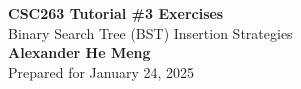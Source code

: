 \begin{titlepage}
    \null %
    \vfill
    \begin{center}
        {\fontsize{35}{48}\selectfont \bfseries CSC263 Tutorial \#3 Exercises}
        \vspace{20pt} \\
        {\LARGE Binary Search Tree (BST) Insertion Strategies} \\
        \vspace{20pt}
        \textbf{Alexander He Meng}
        \vspace{8pt}
        \\ Prepared for January 24, 2025
    \end{center}
    \vfill
\end{titlepage}
